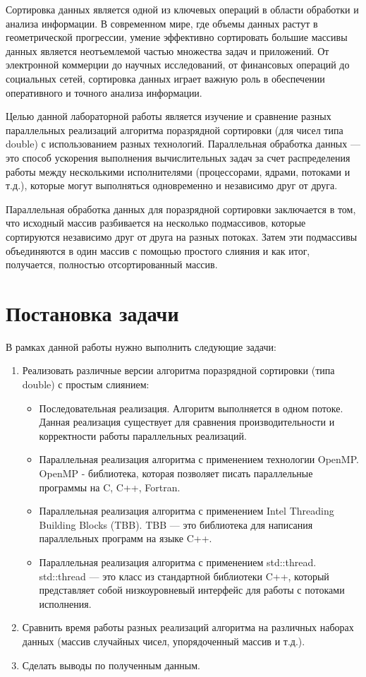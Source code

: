 \documentclass{article}
\begin{document}
Сортировка данных является одной из ключевых операций в области обработки и анализа информации. В современном мире, где объемы данных растут в геометрической прогрессии, умение эффективно сортировать большие массивы данных является неотъемлемой частью множества задач и приложений. От электронной коммерции до научных исследований, от финансовых операций до социальных сетей, сортировка данных играет важную роль в обеспечении оперативного и точного анализа информации.

Целью данной лабораторной работы является изучение и сравнение разных параллельных реализаций алгоритма поразрядной сортировки (для чисел типа double) с использованием разных технологий. Параллельная обработка данных — это способ ускорения выполнения вычислительных задач за счет распределения работы между несколькими исполнителями (процессорами, ядрами, потоками и т.д.), которые могут выполняться одновременно и независимо друг от друга.

Параллельная обработка данных для поразрядной сортировки заключается в том, что исходный массив разбивается на несколько подмассивов, которые сортируются независимо друг от друга на разных потоках. Затем эти подмассивы объединяются в один массив с помощью простого слияния и как итог, получается, полностью отсортированный массив.

\newpage
\section{Постановка задачи}
В рамках данной работы нужно выполнить следующие задачи:
\begin{enumerate}
    \item Реализовать различные версии алгоритма поразрядной сортировки (типа double) с простым слиянием:  \begin{itemize} \item Последовательная реализация. Алгоритм выполняется в одном потоке. Данная реализация существует для сравнения производительности и корректности работы параллельных реализаций. \item Параллельная реализация алгоритма с применением технологии OpenMP. OpenMP - библиотека, которая позволяет писать параллельные программы на C, C++, Fortran. \item Параллельная реализация алгоритма с применением Intel Threading Building Blocks (TBB). TBB — это библиотека для написания параллельных программ на языке C++. \item Параллельная реализация алгоритма с применением std::thread. std::thread — это класс из стандартной библиотеки C++, который представляет собой низкоуровневый интерфейс для работы с потоками исполнения. \end{itemize}
    \item Сравнить время работы разных реализаций алгоритма на различных наборах данных (массив случайных чисел, упорядоченный массив и т.д.).
    \item Сделать выводы по полученным данным.
\end{enumerate}
\end{document}
